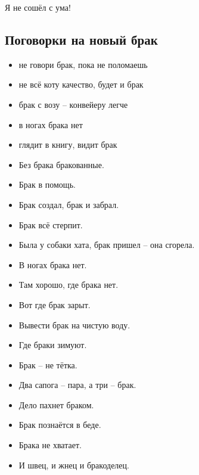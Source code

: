 \begin{epigraph}
    Я не сошёл с ума!\\
\end{epigraph}

\subsection{Поговорки на новый брак}
\label{wasteverbs}

\begin{itemize}
    \item не говори брак, пока не поломаешь
    \item не всё коту качество, будет и брак
    \item брак с возу -- конвейеру легче
    \item в ногах брака нет
    \item глядит в книгу, видит брак
    \item Без брака бракованные.
    \item Брак в помощь.
    \item Брак создал, брак и забрал.
    \item Брак всё стерпит.
    \item Была у собаки хата, брак пришел -- она сгорела.
    \item В ногах брака нет.
    \item Там хорошо, где брака нет.
    \item Вот где брак зарыт.
    \item Вывести брак на чистую воду.
    \item Где браки зимуют.
    \item Брак -- не тётка.
    \item Два сапога -- пара, а три -- брак.
    \item Дело пахнет браком.
    \item Брак познаётся в беде.
    \item Брака не хватает.
    \item И швец, и жнец и бракоделец.
\end{itemize}

